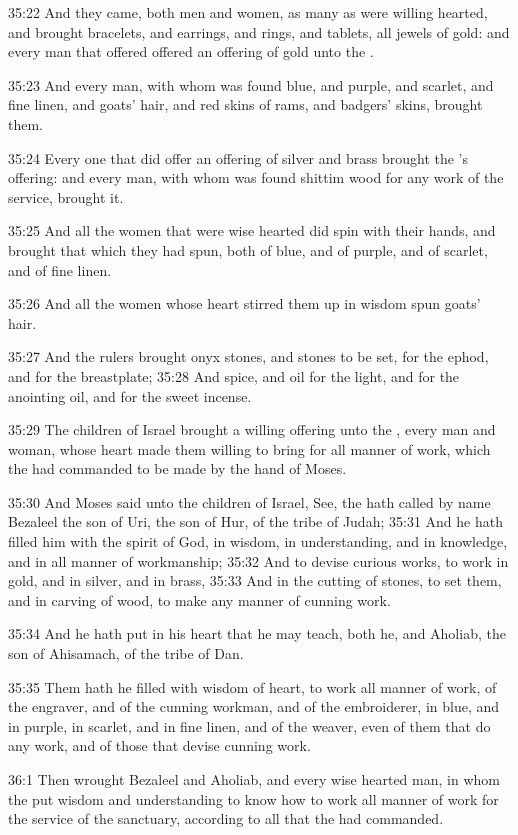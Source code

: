 35:22 And they came, both men and women, as many as were willing hearted, and brought bracelets, and earrings, and rings, and tablets, all jewels of gold: and every man that offered offered an offering of gold unto the \LORD.

35:23 And every man, with whom was found blue, and purple, and scarlet, and fine linen, and goats' hair, and red skins of rams, and badgers' skins, brought them.

35:24 Every one that did offer an offering of silver and brass brought the \LORD's offering: and every man, with whom was found shittim wood for any work of the service, brought it.

35:25 And all the women that were wise hearted did spin with their hands, and brought that which they had spun, both of blue, and of purple, and of scarlet, and of fine linen.

35:26 And all the women whose heart stirred them up in wisdom spun goats' hair.

35:27 And the rulers brought onyx stones, and stones to be set, for the ephod, and for the breastplate; 35:28 And spice, and oil for the light, and for the anointing oil, and for the sweet incense.

35:29 The children of Israel brought a willing offering unto the \LORD, every man and woman, whose heart made them willing to bring for all manner of work, which the \LORD had commanded to be made by the hand of Moses.

35:30 And Moses said unto the children of Israel, See, the \LORD hath called by name Bezaleel the son of Uri, the son of Hur, of the tribe of Judah; 35:31 And he hath filled him with the spirit of God, in wisdom, in understanding, and in knowledge, and in all manner of workmanship; 35:32 And to devise curious works, to work in gold, and in silver, and in brass, 35:33 And in the cutting of stones, to set them, and in carving of wood, to make any manner of cunning work.

35:34 And he hath put in his heart that he may teach, both he, and Aholiab, the son of Ahisamach, of the tribe of Dan.

35:35 Them hath he filled with wisdom of heart, to work all manner of work, of the engraver, and of the cunning workman, and of the embroiderer, in blue, and in purple, in scarlet, and in fine linen, and of the weaver, even of them that do any work, and of those that devise cunning work.

36:1 Then wrought Bezaleel and Aholiab, and every wise hearted man, in whom the \LORD put wisdom and understanding to know how to work all manner of work for the service of the sanctuary, according to all that the \LORD had commanded.


